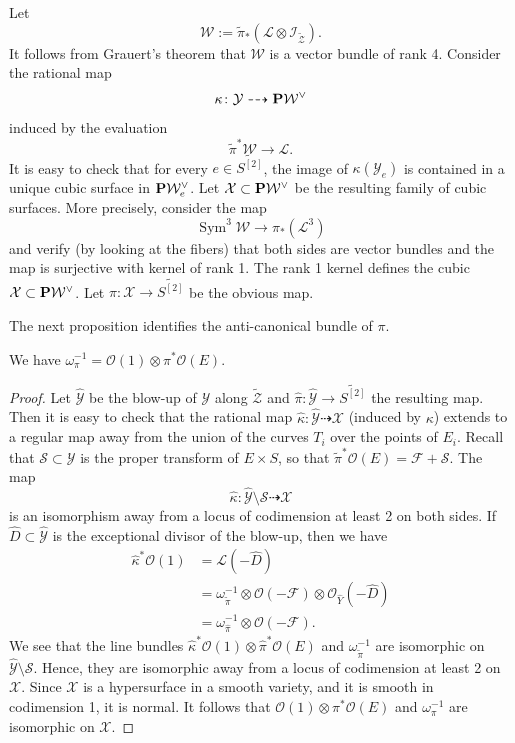 \documentclass[reqno]{amsart}
\renewcommand{\to}{{\longrightarrow}}
\renewcommand {\P}{{\bf P}}
\providecommand{\Sym}{\operatorname{Sym}}
\numberwithin{equation}{section}
\renewcommand{\O}{\mathcal{O}}
\begin{document}
Let
\[
\mathcal{W} := \widetilde{\pi}_* \left( \mathcal{L} \otimes \mathcal{I}_{\widetilde{\mathcal{Z}}} \right).
\]
It follows from Grauert's theorem that $\mathcal{W}$ is a vector bundle of rank 4.
Consider the rational map
\[ \kappa \colon \mathcal{Y} \dashrightarrow \P \mathcal{W}^{\vee}\]
induced by the evaluation
\[ \widetilde{\pi}^* \mathcal{W} \to \mathcal{L}.\]
It is easy to check that for every $e \in \widetilde{S^{[2]}}$, the image of $\kappa(\mathcal{Y}_e)$ is contained in a unique cubic surface in $\P \mathcal{W}^{\vee}_e$.
Let $\mathcal{X} \subset \P \mathcal{W}^{\vee}$ be the resulting family of cubic surfaces.
More precisely, consider the map
\[ \Sym^3 \mathcal{W} \to \pi_*(\mathcal{L}^3)\]
and verify (by looking at the fibers) that both sides are vector bundles and the map is surjective with kernel of rank 1.
The rank 1 kernel defines the cubic $\mathcal{X} \subset \P \mathcal{W}^{\vee}$.
Let $\pi \colon \mathcal{X} \to \widetilde{S^{[2]}}$ be the obvious map.

The next proposition identifies the anti-canonical bundle of $\pi$.
\begin{proposition}
  We have $\omega_{\pi}^{-1} = \O(1) \otimes \pi^*\O(E)$.
\end{proposition}
\begin{proof}
  Let $\widehat {\mathcal{Y}}$ be the blow-up of $\mathcal{Y}$ along $\widetilde{\mathcal{Z}}$ and $\widehat{\pi} \colon \widehat{\mathcal{Y}} \to \widetilde{S^{[2]}}$ the resulting map.
  Then it is easy to check that the rational map $\widehat{\kappa} \colon \widehat {\mathcal{Y}} \dashrightarrow \mathcal{X}$ (induced by $\kappa$) extends to a regular map away from the union of the curves $T_i$ over the points of $E_i$.
  Recall that $\mathcal{S} \subset \mathcal{Y}$ is the proper transform of $E \times S$, so that $\widetilde{\pi}^* \O(E) = \mathcal{F} + \mathcal{S}$.
  The map
  \[
    \widehat{\kappa} \colon \widehat {\mathcal{Y}} \setminus \mathcal{S} \dashrightarrow \mathcal{X}
  \]
  is an isomorphism away from a locus of codimension at least 2 on both sides.
  If $\widehat D \subset \widehat {\mathcal{Y}}$ is the exceptional divisor of the blow-up, then we have
  \begin{align*}
    \widehat{\kappa} ^* \O(1) &= \mathcal{L}(-\widehat D) \\
                             &= \omega^{-1}_{\widetilde{\pi}} \otimes \O(-\mathcal{F}) \otimes \O_{\widehat Y}(-\widehat D) \\
                             &= \omega_{\widehat{\pi}}^{-1} \otimes \O(-\mathcal{F}).
  \end{align*}
  We see that the line bundles $\widehat{\kappa}^* \O(1) \otimes \widehat{\pi}^* \O(E)$ and $\omega_{\widetilde{\pi}}^{-1}$ are isomorphic on $\widehat {\mathcal{Y}} \setminus \mathcal{S}$.
  Hence, they are isomorphic away from a locus of codimension at least 2 on $\mathcal{X}$.
  Since $\mathcal{X}$ is a hypersurface in a smooth variety, and it is smooth in codimension 1, it is normal.
  It follows that $\O(1) \otimes \pi^* \O(E)$ and $\omega_{\pi}^{-1}$ are isomorphic on $\mathcal{X}$.
\end{proof}
\end{document}

